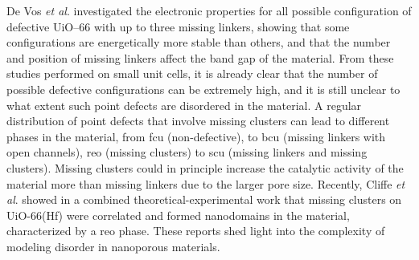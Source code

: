 De Vos \textit{et al}.\cite{devos2017missing} investigated the electronic properties for all possible configuration of defective UiO--66 with up to three missing linkers, showing that some configurations are energetically more stable than others, and that the number and position of missing linkers affect the band gap of the material. From these studies performed on small unit cells, it is already clear that the number of possible defective configurations can be extremely high, and it is still unclear to what extent such point defects are disordered in the material. A regular distribution of point defects that involve missing clusters can lead to different phases in the material, from fcu (non-defective), to bcu (missing linkers with open channels), reo (missing clusters) to scu (missing linkers and missing clusters). Missing clusters could in principle increase the catalytic activity of the material more than missing linkers due to the larger pore size. Recently, Cliffe \textit{et al}. \cite{cliffe2014correlated} showed in a combined theoretical-experimental work that missing clusters on UiO-66(Hf) were correlated and formed nanodomains in the material, characterized by a reo phase. These reports shed light into the complexity of modeling disorder in nanoporous materials. 

